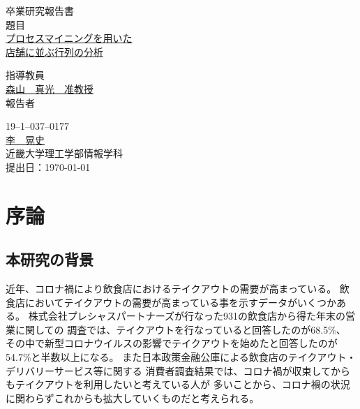 \documentclass{jsarticle}
\begin{document}
 
\begin{center}
\vspace*{1cm}
\large
{\LARGE 卒業研究報告書}\\
\vspace*{0.8cm}
題目\\
\vspace*{1cm}
{\Huge \underline{プロセスマイニングを用いた} \\ \underline{店舗に並ぶ行列の分析}}
\vspace{3mm}
 
\vspace*{3cm}
指導教員\\
\vspace*{0.3cm}
\underline{\LARGE 森山　真光　准教授}\\
\vspace*{3cm}
報告者\\
\vspace*{0.3cm}
 
{19--1--037--0177}\\
\vspace*{0.3cm}
\underline{\Huge 李　晃史}\\
\vspace*{0.5cm}
近畿大学理工学部情報学科\\
\vspace*{2cm}
提出日：\today 
\end{center}
 
\newpage
\normalsize

\tableofcontents

\newpage

\section{序論}
\subsection{本研究の背景}
近年、コロナ禍により飲食店におけるテイクアウトの需要が高まっている。
飲食店においてテイクアウトの需要が高まっている事を示すデータがいくつかある。
株式会社プレシャスパートナーズが行なった931の飲食店から得た年末の営業に関しての
調査\cite{bibi6}では、テイクアウトを行なっていると回答したのが68.5\%、
その中で新型コロナウイルスの影響でテイクアウトを始めたと回答したのが54.7\%と半数以上になる。
また日本政策金融公庫による飲食店のテイクアウト・デリバリーサービス等に関する
消費者調査結果\cite{bibi7}では、コロナ禍が収束してからもテイクアウトを利用したいと考えている人が
多いことから、コロナ禍の状況に関わらずこれからも拡大していくものだと考えられる。
\end{document}
